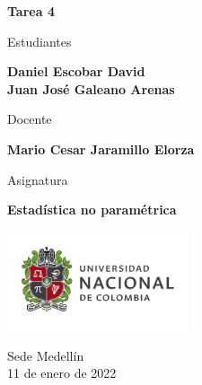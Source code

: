 \begin{titlepage}
   \Large{
   \begin{center}
       \vspace*{1cm}

       \textbf{Tarea 4}

            
       \vspace{1.5cm}
       
       Estudiantes
       
       \vspace{0.5cm}
        
        
       \textbf{Daniel Escobar David} \\

	\textbf{Juan José Galeano Arenas}

              \vspace{1cm}
       
       Docente
       
       \vspace{0.5cm}

       \textbf{Mario Cesar Jaramillo Elorza}
       
       \vspace{0.4cm}

       \vspace{1.4cm}
       
       Asignatura
       
       \vspace{0.5cm}

       \textbf{Estadística no paramétrica}

       \vfill

            
       \vspace{0.4cm}
     
       \includegraphics[width=0.4\textwidth]{logounal.png}
            
       Sede Medellín\\
       11 de enero de 2022
       
   \end{center}
   }
\end{titlepage}